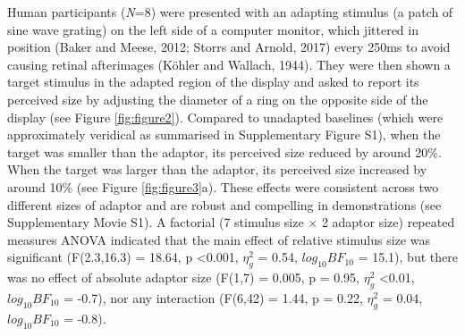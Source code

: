 \documentclass[
]{article}
\begin{document}
Human participants (\emph{N}=8) were presented with an adapting stimulus (a patch of sine wave grating) on the left side of a computer monitor, which jittered in position (Baker and Meese, 2012; Storrs and Arnold, 2017) every 250ms to avoid causing retinal afterimages (Köhler and Wallach, 1944). They were then shown a target stimulus in the adapted region of the display and asked to report its perceived size by adjusting the diameter of a ring on the opposite side of the display (see Figure \ref{fig:figure2}). Compared to unadapted baselines (which were approximately veridical as summarised in Supplementary Figure S1), when the target was smaller than the adaptor, its perceived size reduced by around 20\%. When the target was larger than the adaptor, its perceived size increased by around 10\% (see Figure \ref{fig:figure3}a). These effects were consistent across two different sizes of adaptor and are robust and compelling in demonstrations (see Supplementary Movie S1). A factorial (7 stimulus size \(\times\) 2 adaptor size) repeated measures ANOVA indicated that the main effect of relative stimulus size was significant (F(2.3,16.3) = 18.64, p \textless0.001, \(\eta^2_g\) = 0.54, \(log_{10}BF_{10}\) = 15.1), but there was no effect of absolute adaptor size (F(1,7) = 0.005, p = 0.95, \(\eta^2_g\) \textless0.01, \(log_{10}BF_{10}\) = -0.7), nor any interaction (F(6,42) = 1.44, p = 0.22, \(\eta^2_g\) = 0.04, \(log_{10}BF_{10}\) = -0.8).
\end{document}

